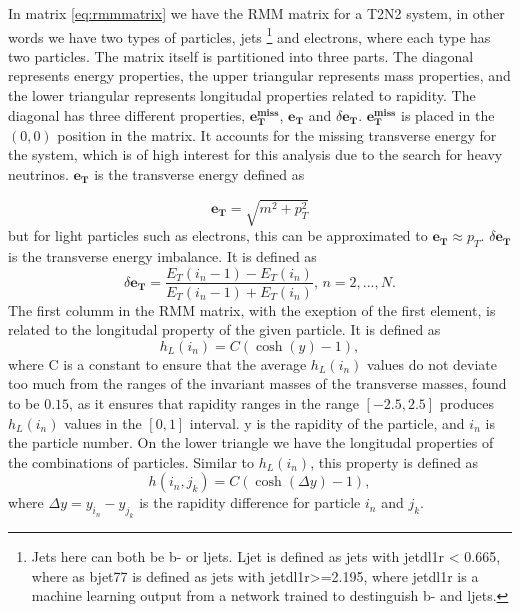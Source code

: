 In matrix \ref{eq:rmmmatrix} we have the RMM matrix for a T2N2 system, in other words we have two types of particles, jets
\footnote{Jets here can both be b- or ljets. Ljet is defined as jets with jetdl1r < 0.665, where as bjet77 is defined as jets with jetdl1r>=2.195, 
where jetdl1r is a machine learning output from a network trained to destinguish b- and ljets.} and electrons, where each type has two particles. 
The matrix itself is partitioned into three parts. 
The diagonal represents energy properties, the upper triangular represents mass properties, and the lower triangular represents longitudal 
properties related to rapidity. The diagonal has three different properties, $\boldsymbol{e_T^{miss}}$, $\boldsymbol{e_T}$ and $\delta\boldsymbol{e_T}$. 
$\boldsymbol{e_T^{miss}}$ is placed in the $(0,0)$ position in the matrix. It accounts for the missing transverse energy for the system, which is of 
high interest for this analysis due to the search for heavy neutrinos. $\boldsymbol{e_T}$ is the transverse energy defined as 

\begin{equation}\label{eq:et}
    \boldsymbol{e_T} = \sqrt{m^2 + p_T^2}
\end{equation}
but for light particles such as electrons, this can be approximated to $\boldsymbol{e_T} \approx p_T$. $\delta\boldsymbol{e_T}$ 
is the transverse energy imbalance. It is defined as 
\begin{equation}\label{eq:deltaet}
    \delta\boldsymbol{e_T} = \frac{E_T(i_n-1) - E_T(i_n)}{E_T(i_n-1) + E_T(i_n)}, \, n = 2, ..., N.
\end{equation}
The first columm in the RMM matrix, with the exeption of the first element, is related to the longitudal property of the given particle. 
It is defined as
\begin{equation*}
    h_L(i_n) = C(\cosh{(y)} - 1),
\end{equation*}
where C is a constant to ensure that the average $h_L(i_n)$ values do not deviate too much from the ranges of the invariant masses 
of the transverse masses, found to be $0.15$, as it ensures that rapidity ranges in the range $[-2.5, 2.5]$ produces $h_L(i_n)$ values in the 
$[0,1]$ interval\cite{Chekanov_2019}. y is the rapidity of the particle, and $i_n$ is the particle number. 
On the lower triangle we have the longitudal properties of the combinations of particles. Similar to $h_L(i_n)$, this property is defined as 
\begin{equation*}
    h(i_n, j_k) = C(\cosh{(\Delta y)} - 1),
\end{equation*}
where $\Delta y = y_{i_n} - y_{j_k}$ is the rapidity difference for particle $i_n$ and $j_k$. 


